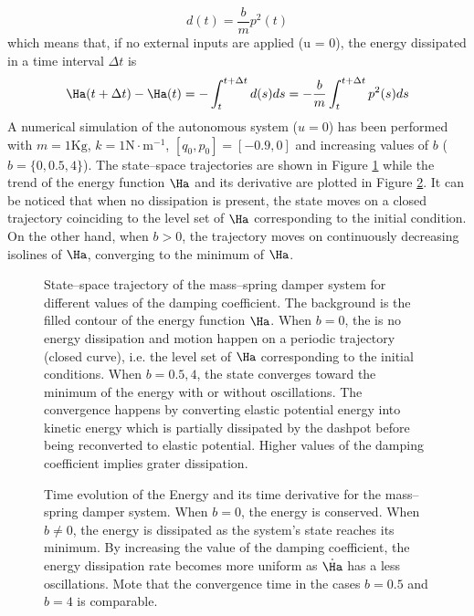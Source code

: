 \begin{exmp}
    \begin{equation}
        d(t) = \frac{b}{m}p^2(t)
    \end{equation}
    which means that, if no external inputs are applied (u = 0), the energy dissipated in a time interval $\Delta t$ is
    \begin{equation}
        \Ha(t+\Delta t) - \Ha(t) = -\int_t^{t+\Delta t}d(s)ds = -\frac{b}{m}\int_t^{t+\Delta t}p^2(s)ds
    \end{equation}
    A numerical simulation of the autonomous system ($u = 0$) has been performed with $m = 1\text{Kg}$, $k = 1\text{N}\cdot\text{m}^{-1}$, $[q_0,p_0] = [-0.9,0]$ and increasing values of $b$ ($b = \{0, 0.5, 4\}$). The state--space trajectories are shown in Figure \ref{fig:msd_ss} while the trend of the energy function $\Ha$ and its derivative are plotted in Figure \ref{fig:msd_en}. It can be noticed that when no dissipation is present, the state moves on a closed trajectory coinciding to the level set of $\Ha$ corresponding to the initial condition. On the other hand, when $b>0$, the trajectory moves on continuously decreasing isolines of $\Ha$, converging to the minimum of $\Ha$.
    \begin{figure}[!ht]
        \centering
        \caption[State--space trajectory of the mass--spring damper system for different values of the damping coefficient.]{State--space trajectory of the mass--spring damper system for different values of the damping coefficient. The background is the filled contour of the energy function $\Ha$. When $b = 0$, the is no energy dissipation and motion happen on a periodic trajectory (closed curve), i.e. the level set of $\Ha$ corresponding to the initial conditions. When $b = 0.5, 4$, the state converges toward the minimum of the energy with or without oscillations. The convergence happens by converting elastic potential energy into kinetic energy which is partially dissipated by the dashpot before being reconverted to elastic potential. Higher values of the damping coefficient implies grater dissipation.}
        \label{fig:msd_ss}
    \end{figure}
    \begin{figure}[!ht]
        \centering
        \caption[Time evolution of the Energy of the mass--spring damper system.]{Time evolution of the Energy and its time derivative for the mass--spring damper system. When $b=0$, the energy is conserved. When $b\neq 0$, the energy is dissipated as the system's state reaches its minimum. By increasing the value of the damping coefficient, the energy dissipation rate becomes more uniform as $\dot{\Ha}$ has a less oscillations. Mote that the convergence time in the cases $b = 0.5$ and $b = 4$ is comparable.}
        \label{fig:msd_en}
    \end{figure}
\end{exmp}
